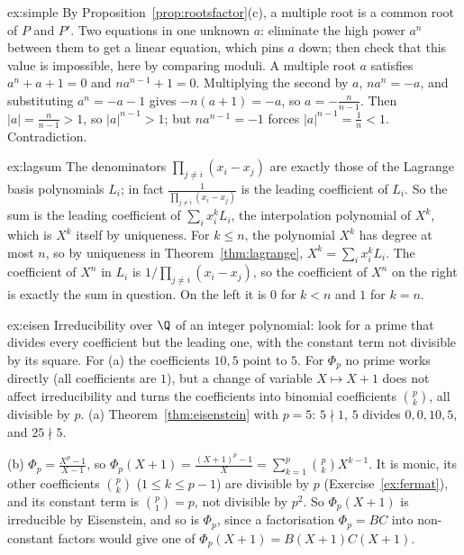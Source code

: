 \begin{solution}{ex:simple}
\idea By Proposition~\ref{prop:rootsfactor}(c), a multiple root is a common root of $P$ and $P'$. Two equations in one unknown $a$: eliminate the high power $a^n$ between them to get a linear equation, which pins $a$ down; then check that this value is impossible, here by comparing moduli.
\writeup A multiple root $a$ satisfies $a^n+a+1=0$ and $na^{n-1}+1=0$. Multiplying the second by $a$, $na^n=-a$, and substituting $a^n=-a-1$ gives
$-n(a+1)=-a$, so $a=-\frac n{n-1}$. Then $|a|=\frac n{n-1}>1$, so $|a|^{n-1}>1$; but $na^{n-1}=-1$ forces $|a|^{n-1}=\frac1n<1$. Contradiction.
\end{solution}

\begin{solution}{ex:lagsum}
\idea The denominators $\prod_{j\ne i}(x_i-x_j)$ are exactly those of the Lagrange basis polynomials $L_i$; in fact $\frac1{\prod_{j\ne i}(x_i-x_j)}$ is the leading coefficient of $L_i$. So the sum is the leading coefficient of $\sum_ix_i^kL_i$, the interpolation polynomial of $X^k$, which is $X^k$ itself by uniqueness.
\writeup For $k\le n$, the polynomial $X^k$ has degree at most $n$, so by uniqueness in Theorem~\ref{thm:lagrange}, $X^k=\sum_ix_i^kL_i$.
The coefficient of $X^n$ in $L_i$ is $1/\prod_{j\ne i}(x_i-x_j)$, so the coefficient of $X^n$ on the right is exactly the sum in question.
On the left it is $0$ for $k<n$ and $1$ for $k=n$.
\end{solution}

\begin{solution}{ex:eisen}
\idea Irreducibility over $\Q$ of an integer polynomial: look for a prime that divides every coefficient but the leading one, with the constant term not divisible by its square. For (a) the coefficients $10,5$ point to $5$. For $\Phi_p$ no prime works directly (all coefficients are $1$), but a change of variable $X\mapsto X+1$ does not affect irreducibility and turns the coefficients into binomial coefficients $\binom pk$, all divisible by $p$.
\writeup (a) Theorem~\ref{thm:eisenstein} with $p=5$: $5\nmid1$, $5$ divides $0,0,10,5$, and $25\nmid5$.

(b) $\Phi_p=\frac{X^p-1}{X-1}$, so $\Phi_p(X+1)=\frac{(X+1)^p-1}X=\sum_{k=1}^p\binom pkX^{k-1}$. It is monic, its other coefficients
$\binom pk$ ($1\le k\le p-1$) are divisible by $p$ (Exercise~\ref{ex:fermat}), and its constant term is $\binom p1=p$, not divisible by $p^2$.
So $\Phi_p(X+1)$ is irreducible by Eisenstein, and so is $\Phi_p$, since a factorisation $\Phi_p=BC$ into non-constant factors would give one of $\Phi_p(X+1)=B(X+1)C(X+1)$.
\end{solution}


